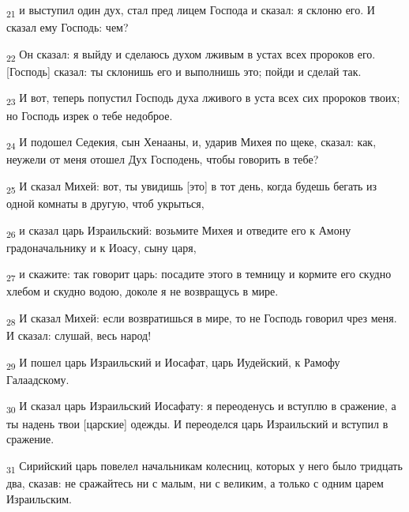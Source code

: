 \begin{tcolorbox}
\textsubscript{21} и выступил один дух, стал пред лицем Господа и сказал: я склоню его. И сказал ему Господь: чем?
\end{tcolorbox}
\begin{tcolorbox}
\textsubscript{22} Он сказал: я выйду и сделаюсь духом лживым в устах всех пророков его. [Господь] сказал: ты склонишь его и выполнишь это; пойди и сделай так.
\end{tcolorbox}
\begin{tcolorbox}
\textsubscript{23} И вот, теперь попустил Господь духа лживого в уста всех сих пророков твоих; но Господь изрек о тебе недоброе.
\end{tcolorbox}
\begin{tcolorbox}
\textsubscript{24} И подошел Седекия, сын Хенааны, и, ударив Михея по щеке, сказал: как, неужели от меня отошел Дух Господень, чтобы говорить в тебе?
\end{tcolorbox}
\begin{tcolorbox}
\textsubscript{25} И сказал Михей: вот, ты увидишь [это] в тот день, когда будешь бегать из одной комнаты в другую, чтоб укрыться,
\end{tcolorbox}
\begin{tcolorbox}
\textsubscript{26} и сказал царь Израильский: возьмите Михея и отведите его к Амону градоначальнику и к Иоасу, сыну царя,
\end{tcolorbox}
\begin{tcolorbox}
\textsubscript{27} и скажите: так говорит царь: посадите этого в темницу и кормите его скудно хлебом и скудно водою, доколе я не возвращусь в мире.
\end{tcolorbox}
\begin{tcolorbox}
\textsubscript{28} И сказал Михей: если возвратишься в мире, то не Господь говорил чрез меня. И сказал: слушай, весь народ!
\end{tcolorbox}
\begin{tcolorbox}
\textsubscript{29} И пошел царь Израильский и Иосафат, царь Иудейский, к Рамофу Галаадскому.
\end{tcolorbox}
\begin{tcolorbox}
\textsubscript{30} И сказал царь Израильский Иосафату: я переоденусь и вступлю в сражение, а ты надень твои [царские] одежды. И переоделся царь Израильский и вступил в сражение.
\end{tcolorbox}
\begin{tcolorbox}
\textsubscript{31} Сирийский царь повелел начальникам колесниц, которых у него было тридцать два, сказав: не сражайтесь ни с малым, ни с великим, а только с одним царем Израильским.
\end{tcolorbox}
